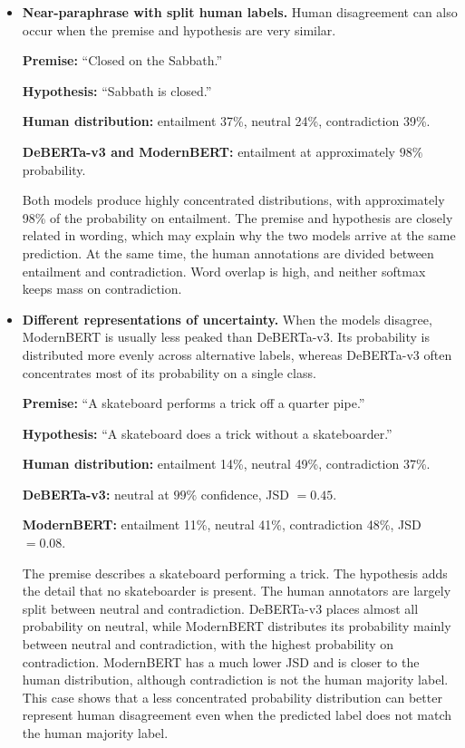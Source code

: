 \documentclass[11pt,a4paper]{article}
\begin{document}
\begin{itemize}[itemsep=0.5em, topsep=0.4em]
\item \textbf{Near-paraphrase with split human labels.}
Human disagreement can also occur when the premise and hypothesis are very similar.

\textbf{Premise:} ``Closed on the Sabbath.''

\textbf{Hypothesis:} ``Sabbath is closed.''

\textbf{Human distribution:} entailment 37\%, neutral 24\%, contradiction 39\%.

\textbf{DeBERTa-v3 and ModernBERT:} entailment at approximately $98\%$ probability.

Both models produce highly concentrated distributions, with approximately 98\% of the probability on entailment. The premise and hypothesis are closely related in wording, which may explain why the two models arrive at the same prediction. At the same time, the human annotations are divided between entailment and contradiction. Word overlap is high, and neither softmax keeps mass on contradiction.

\item \textbf{Different representations of uncertainty.}
When the models disagree, ModernBERT is usually less peaked than DeBERTa-v3. Its probability is distributed more evenly across alternative labels, whereas DeBERTa-v3 often concentrates most of its probability on a single class.

\textbf{Premise:} ``A skateboard performs a trick off a quarter pipe.''

\textbf{Hypothesis:} ``A skateboard does a trick without a skateboarder.''

\textbf{Human distribution:} entailment 14\%, neutral 49\%, contradiction 37\%.

\textbf{DeBERTa-v3:} neutral at $99\%$ confidence, JSD $=0.45$.

\textbf{ModernBERT:} entailment 11\%, neutral 41\%, contradiction 48\%, JSD $=0.08$.

The premise describes a skateboard performing a trick. The hypothesis adds the detail that no skateboarder is present. The human annotators are largely split between neutral and contradiction. DeBERTa-v3 places almost all probability on neutral, while ModernBERT distributes its probability mainly between neutral and contradiction, with the highest probability on contradiction. ModernBERT has a much lower JSD and is closer to the human distribution, although contradiction is not the human majority label. This case shows that a less concentrated probability distribution can better represent human disagreement even when the predicted label does not match the human majority label.


\end{itemize}
\end{document}

